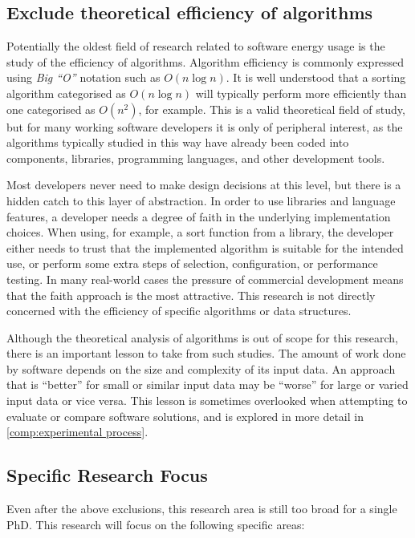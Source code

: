 \subsection{Exclude theoretical efficiency of algorithms}
\label{exclude:algorithms}

Potentially the oldest field of research related to software energy usage is the study of the efficiency of algorithms. Algorithm efficiency is commonly expressed using \emph{Big \enquote{O}} notation such as $O(n\log{}n)$. It is well understood that a sorting algorithm categorised as $O(n\log n)$ will typically perform more efficiently than one categorised as $O(n^2)$, for example. This is a valid theoretical field of study, but for many working software developers it is only of peripheral interest, as the algorithms typically studied in this way have already been coded into components, libraries, \gls{programming language}s, and other development tools. 

Most developers never need to make design decisions at this level, but there is a hidden catch to this layer of abstraction. In order to use libraries and language features, a developer needs a degree of faith in the underlying implementation choices. When using, for example, a sort function from a library, the developer either needs to trust that the implemented algorithm is suitable for the intended use, or perform some extra steps of selection, configuration, or performance testing. In many real-world cases the pressure of commercial development means that the faith approach is the most attractive. This research is not directly concerned with the efficiency of specific algorithms or data structures.

Although the theoretical analysis of algorithms is out of scope for this research, there is an important lesson to take from such studies. The amount of work done by software depends on the size and complexity of its input data. An approach that is \enquote{better} for small or similar input data may be \enquote{worse} for large or varied input data or vice versa. This lesson is sometimes overlooked when attempting to evaluate or compare software solutions, and is explored in more detail in \autoref{comp:experimental process}.

\subsection{Specific Research Focus}

Even after the above exclusions, this research area is still too broad for a single PhD. This research will focus on the following specific areas:

